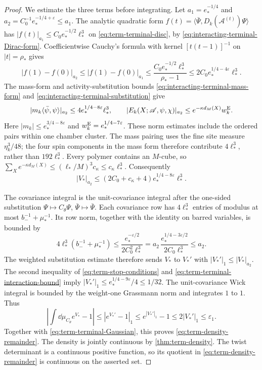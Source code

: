 \begin{proof}
We estimate the three terms before integrating.
Let $a_1=e_*^{-1/4}$ and
$a_2=C_0^{-1}e_*^{-1/4+\varepsilon}\le a_1$.
The analytic quadratic form
$f(t)=\langle\bar\Psi,D_k(\mathscr A^{(t)})\Psi\rangle$
has $|f(t)|_{a_1}\le C_0e_*^{-1/2}\ell_*^3$ on
\eqref{eq:term-terminal-disc}, by
\eqref{eq:interacting-terminal-Dirac-form}.
Coefficientwise Cauchy's formula with kernel
$[t(t-1)]^{-1}$ on $|t|=\rho_*$ gives
\[
 |f(1)-f(0)|_{a_2}
 \le |f(1)-f(0)|_{a_1}
 \le\frac{C_0e_*^{-1/2}\ell_*^3}{\rho_*-1}
                  \le2C_0e_*^{1/4-4\varepsilon}\ell_*^3 .
\]
The mass-form and activity-substitution bounds
\eqref{eq:interacting-terminal-mass-form} and
\eqref{eq:interacting-terminal-substitution} give
\[
 |m_k\langle\bar\psi,\psi\rangle|_{a_2}
                \le4e_*^{1/4-8\varepsilon}\ell_*^3,\qquad
 |E_k(X;\mathscr A,\psi,\chi)|_{a_2}
                 \le e^{-\kappa d_M(X)}w_k^{\rm E}.
\]
Here $|m_k|\le e_*^{3/4-8\varepsilon}$ and
$w_k^{\rm E}=e_*^{1/4-7\varepsilon}$.
These norm estimates include the ordered pairs within
one chamber cluster. The mass pairing uses the fine site measure
$\eta_k^3/48$;
the four spin components in the mass form therefore
contribute $4\ell_*^3$, rather than $192\ell_*^3$.
Every polymer contains an $M$-cube, so
$\sum_Xe^{-\kappa d_M(X)}
\le(\ell_*/M)^3c_\kappa\le c_\kappa\ell_*^3$.
Consequently
\begin{equation}\label{eq:term-terminal-interaction-bound}
 |V_*|_{a_2}\le
            (2C_0+c_\kappa+4)e_*^{1/4-8\varepsilon}\ell_*^3.
\end{equation}

The covariance integral is the unit-covariance integral
after the one-sided substitution
$\Psi\mapsto C_\theta\Psi$, $\bar\Psi\mapsto\bar\Psi$.
Each covariance row has $4\ell_*^3$ entries of modulus
at most $b_-^{-1}+\mu_*^{-1}$.
Its row norm, together with the identity on barred
variables, is bounded by
\[
 4\ell_*^3(b_-^{-1}+\mu_*^{-1})
 \le\frac{e_*^{-\varepsilon/2}}{2C_0^2\ell_*^3}
 =a_2\,\frac{e_*^{1/4-3\varepsilon/2}}{2C_0\ell_*^3}
 \le a_2.
\]
The weighted substitution estimate therefore sends
$V_*$ to $V_*'$ with $|V_*'|_1\le|V_*|_{a_2}$.
The second inequality of \eqref{eq:term-stop-conditions}
and \eqref{eq:term-terminal-interaction-bound} imply
$|V_*'|_1\le e_*^{1/4-9\varepsilon}/4\le1/32$.
The unit-covariance Wick integral is bounded by the
weight-one Grassmann norm and integrates $1$ to $1$.
Thus
\[
 \left|\int\dd\mu_{C_\theta}e^{V_*}-1\right|
 \le |e^{V_*'}-1|_1
 \le e^{|V_*'|_1}-1
 \le2|V_*'|_1\le\varepsilon_1.
\]
Together with \eqref{eq:term-terminal-Gaussian}, this
proves \eqref{eq:term-density-remainder}.
The density is jointly continuous by
\cref{thm:term-density}. The twist determinant
is a continuous positive function, so its quotient
in \eqref{eq:term-density-remainder} is continuous
on the asserted set.
\end{proof}

